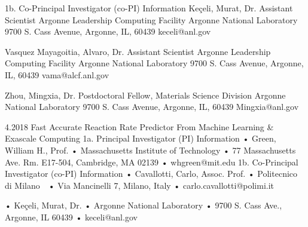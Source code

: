 1b. Co-Principal Investigator (co-PI) Information
Keçeli, Murat, Dr.
Assistant Scientist
Argonne Leadership Computing Facility
Argonne National Laboratory 
9700 S. Cass Avenue, Argonne, IL, 60439
keceli@anl.gov


Vasquez Mayagoitia, Alvaro, Dr.
Assistant Scientist
Argonne Leadership Computing Facility
Argonne National Laboratory 
9700 S. Cass Avenue, Argonne, IL, 60439
vama@alcf.anl.gov


Zhou, Mingxia, Dr.
Postdoctoral Fellow, Materials Science Division 
Argonne National Laboratory 
9700 S. Cass Avenue, Argonne, IL, 60439
Mingxia@anl.gov

4.2018 Fast Accurate Reaction Rate Predictor From Machine Learning & Exascale Computing
1a. Principal Investigator (PI) Information
•	Green, William H., Prof.
•	Massachusetts Institute of Technology
•	77 Massachusetts Ave. Rm. E17-504, Cambridge, MA 02139
•	whgreen@mit.edu
1b. Co-Principal Investigator (co-PI) Information
•	Cavallotti, Carlo, Assoc. Prof.
•	Politecnico di Milano  
•	Via Mancinelli 7, Milano, Italy 
•	carlo.cavallotti@polimi.it
 
•	Keçeli, Murat, Dr.
•	Argonne National Laboratory
•	9700 S. Cass Ave., Argonne, IL 60439
•	keceli@anl.gov
